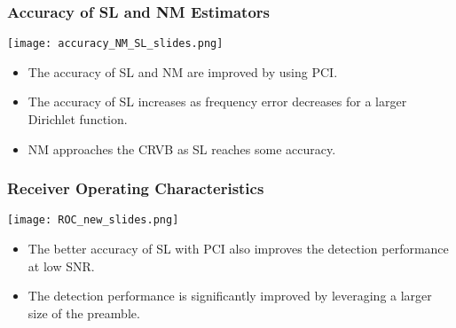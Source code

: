 \begin{frame}
  \frametitle{Accuracy of SL and NM Estimators}

    \begin{center}
      \texttt{[image: accuracy\_NM\_SL\_slides.png]}
    \end{center}

    \begin{itemize}
    
      \item The accuracy of SL and NM are improved by using PCI.
      \item The accuracy of SL increases as frequency error decreases for a larger Dirichlet function.  
      \item NM approaches the CRVB as SL reaches some accuracy.

    \end{itemize}




\end{frame}

\begin{frame}
  \frametitle{Receiver Operating Characteristics}

    \begin{center}
      \texttt{[image: ROC\_new\_slides.png]}
    \end{center}

    \begin{itemize}
    
      \item The better accuracy of SL with PCI also improves the detection performance at low SNR.
      \item The detection performance is significantly improved by leveraging a larger size of the preamble.

    \end{itemize}

\end{frame}